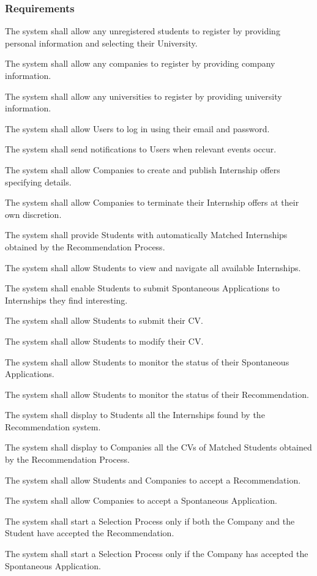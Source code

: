 \subsubsection{Requirements}
\begin{enumerate}[label={\color{titleColor}[R\arabic*]}]
    \item The system shall allow any unregistered students to register by providing personal information and selecting their University.
    \item The system shall allow any companies to register by providing company information.
    \item The system shall allow any universities to register by providing university information.
    \item The system shall allow Users to log in using their email and password.
    \item The system shall send notifications to Users when relevant events occur.

    \item The system shall allow Companies to create and publish Internship offers specifying details.
    \item The system shall allow Companies to terminate their Internship offers at their own discretion.
    \item The system shall provide Students with automatically Matched Internships obtained by the Recommendation Process.
    \item The system shall allow Students to view and navigate all available Internships.
    \item The system shall enable Students to submit Spontaneous Applications to Internships they find interesting.
    \item The system shall allow Students to submit their CV.
    \item The system shall allow Students to modify their CV.
    \item The system shall allow Students to monitor the status of their Spontaneous Applications.
    \item The system shall allow Students to monitor the status of their Recommendation.

    \item The system shall display to Students all the Internships found by the Recommendation system.
    \item The system shall display to Companies all the CVs of Matched Students obtained by the Recommendation Process.
    \item The system shall allow Students and Companies to accept a Recommendation.
    \item The system shall allow Companies to accept a Spontaneous Application.
    \item The system shall start a Selection Process only if both the Company and the Student have accepted the Recommendation.
    \item The system shall start a Selection Process only if the Company has accepted the Spontaneous Application.


\end{enumerate}
